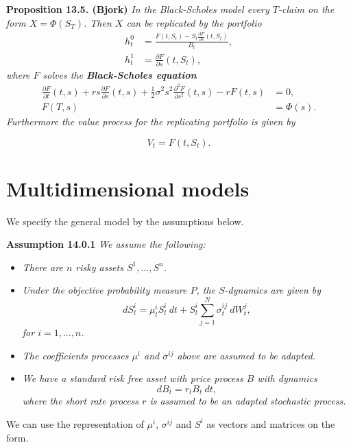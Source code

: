 \documentclass[a4paper,10pt,openany]{book}
\providecommand{\tightlist}{%
 \setlength{\itemsep}{0pt}\setlength{\parskip}{0pt}}
\begin{document}
\textbf{Proposition 13.5. (Bjork)} \emph{In the Black-Scholes model every \(T\)-claim on the form \(X=\Phi(S_T)\). Then \(X\) can be replicated by the portfolio}
\begin{align*}
h_t^0&=\frac{F(t,S_t)-S_t\frac{\partial F}{\partial s}(t,S_t)}{B_t},\tag{13.15}\\
h_t^1&=\frac{\partial F}{\partial s}(t,S_t),\tag{13.15}
\end{align*}
\emph{where \(F\) solves the \textbf{Black-Scholes equation}}
\begin{align*}
\frac{\partial F}{\partial t}(t,s)+rs\frac{\partial F}{\partial s}(t,s)+\frac{1}{2}\sigma^2s^2 \frac{\partial^2 F}{\partial s^2}(t,s)-rF(t,s)&=0,\tag{13.16}\\
F(T,s)&=\Phi(s).\tag{13.16}
\end{align*}
\emph{Furthermore the value process for the replicating portfolio is given by}

\[
V_t=F(t,S_t).
\]

\hypertarget{multidimensional-models}{%
\section{Multidimensional models}\label{multidimensional-models}}

We specify the general model by the assumptions below.

\textbf{Assumption 14.0.1} \emph{We assume the following:}

\begin{itemize}
\tightlist
\item
  \emph{There are \(n\) risky assets \(S^1,...,S^n\).}
\item
  \emph{Under the objective probability measure \(P\), the \(S\)-dynamics are given by}
  \[
    dS_t^i=\mu_t^iS_t^i\ dt +S_t^i\sum_{j=1}^N\sigma_t^{ij}\ dW_t^j,\tag{14.1}
    \]
  \emph{for \(i=1,...,n\).}
\item
  \emph{The coefficients processes \(\mu^i\) and \(\sigma^{ij}\) above are assumed to be adapted.}
\item
  \emph{We have a standard risk free asset with price process \(B\) with dynamics}
  \[
    dB_t=r_tB_t\ dt,\tag{14.2}
    \]
  \emph{where the short rate process \(r\) is assumed to be an adapted stochastic process.}
\end{itemize}

We can use the representation of \(\mu^i\), \(\sigma^{ij}\) and \(S^i\) as vectors and matrices on the form.
\end{document}
